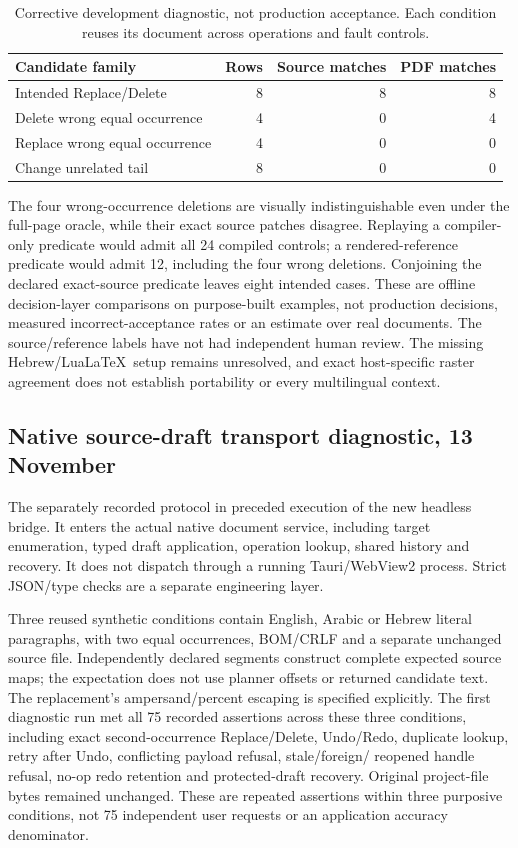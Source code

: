 \begin{table}[htbp]
\small
\begin{tabularx}{\linewidth}{@{}Yrrr@{}}
\toprule
Candidate family & Rows & Source matches & PDF matches\\
\midrule
Intended Replace/Delete & 8 & 8 & 8\\
Delete wrong equal occurrence & 4 & 0 & 4\\
Replace wrong equal occurrence & 4 & 0 & 0\\
Change unrelated tail & 8 & 0 & 0\\
\bottomrule
\end{tabularx}
\caption{Corrective development diagnostic, not production acceptance.
Each condition reuses its document across operations and fault controls.}
\label{tab:occurrence-reference}
\end{table}

The four wrong-occurrence deletions are visually indistinguishable even under
the full-page oracle, while their exact source patches disagree. Replaying a
compiler-only predicate would admit all 24 compiled controls; a rendered-reference
predicate would admit 12, including the four wrong deletions. Conjoining the
declared exact-source predicate leaves eight intended cases. These are offline
decision-layer comparisons on purpose-built examples, not production decisions,
measured incorrect-acceptance rates or an estimate over real documents. The
source/reference labels have not had independent human review. The missing
Hebrew/Lua\LaTeX\ setup remains unresolved, and exact host-specific raster
agreement does not establish portability or every multilingual context.

\subsection{Native source-draft transport diagnostic, 13 November}
The separately recorded protocol in
 preceded execution of the new
headless bridge. It enters the actual native document service, including
target enumeration, typed draft application, operation lookup, shared history
and recovery. It does not dispatch through a running Tauri/WebView2 process.
Strict JSON/type checks are a separate engineering layer.

Three reused synthetic conditions contain English, Arabic or Hebrew literal
paragraphs, with two equal occurrences, BOM/CRLF and a separate unchanged source
file. Independently declared segments construct complete expected source maps;
the expectation does not use planner offsets or returned candidate text.
The replacement's ampersand/percent escaping is specified explicitly. The
first diagnostic run met all 75 recorded assertions across these three
conditions, including exact second-occurrence Replace/Delete, Undo/Redo,
duplicate lookup, retry after Undo, conflicting payload refusal, stale/foreign/
reopened handle refusal, no-op redo retention and protected-draft recovery.
Original project-file bytes remained unchanged. These are repeated assertions
within three purposive conditions, not 75 independent user requests or an
application accuracy denominator.

